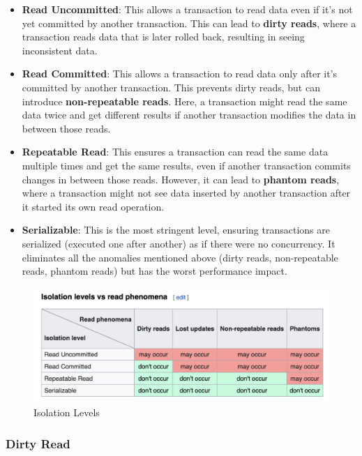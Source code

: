 \begin{itemize}
\item \textbf{Read Uncommitted}: This allows a transaction to read data even if it's not yet committed by another transaction. This can lead to \textbf{dirty reads}, where a transaction reads data that is later rolled back, resulting in seeing inconsistent data.

\item \textbf{Read Committed}: This allows a transaction to read data only after it's committed by another transaction. This prevents dirty reads, but can introduce \textbf{non-repeatable reads}. Here, a transaction might read the same data twice and get different results if another transaction modifies the data in between those reads.

\item \textbf{Repeatable Read}: This ensures a transaction can read the same data multiple times and get the same results, even if another transaction commits changes in between those reads. However, it can lead to \textbf{phantom reads}, where a transaction might not see data inserted by another transaction after it started its own read operation.

\item \textbf{Serializable}: This is the most stringent level, ensuring transactions are serialized (executed one after another) as if there were no concurrency. It eliminates all the anomalies mentioned above (dirty reads, non-repeatable reads, phantom reads) but has the worst performance impact.
\end{itemize}

\begin{figure}[H]
  \includegraphics[width=\linewidth]{images/jdbc/isolation_levels.png}
  \caption{Isolation Levels}
  \label{fig:paths}
\end{figure}


\subsubsection{Dirty Read}

